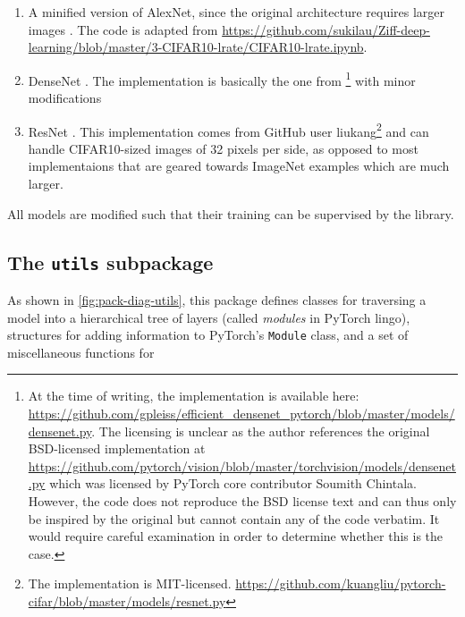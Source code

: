 \begin{enumerate}
    \item
        A minified version of AlexNet, since the original architecture
        requires larger images \citep{krizhevsky2012imagenet}. The
        code is adapted from
        \url{https://github.com/sukilau/Ziff-deep-learning/blob/master/3-CIFAR10-lrate/CIFAR10-lrate.ipynb}.
    \item
        DenseNet \citep{huang2017densely}. The implementation is basically the
        one from \citep{pleiss2017memory}\footnote{At the time of writing, the
            implementation is available here:
            \url{https://github.com/gpleiss/efficient_densenet_pytorch/blob/master/models/densenet.py}.
            The licensing is unclear as the author references the original
            BSD-licensed implementation at
            \url{https://github.com/pytorch/vision/blob/master/torchvision/models/densenet.py}
            which was licensed by PyTorch core contributor Soumith Chintala.
            However, the code does not reproduce the BSD license text and can
            thus only be inspired by the original but cannot contain any of the
        code verbatim. It would require careful examination in order to
    determine whether this is the case.} with minor modifications
    \item
        ResNet \citep{he2016deep}. This implementation comes from
        GitHub user liukang\footnote{The implementation is MIT-licensed.
        \url{https://github.com/kuangliu/pytorch-cifar/blob/master/models/resnet.py}}
        and can handle CIFAR10-sized images of 32 pixels per side, as opposed
        to most implementaions that are geared towards ImageNet examples which
        are much larger.
\end{enumerate}

All models are modified such that their training can be supervised by
the library.

\hypertarget{sec:pack-utils}{%
\subsection{The \texttt{utils} subpackage}\label{sec:pack-utils}}

As shown in \cref{fig:pack-diag-utils}, this package defines classes for
traversing a model into a hierarchical tree of layers (called \emph{modules} in
PyTorch lingo), structures for adding information to PyTorch's \texttt{Module}
class, and a set of miscellaneous functions for

